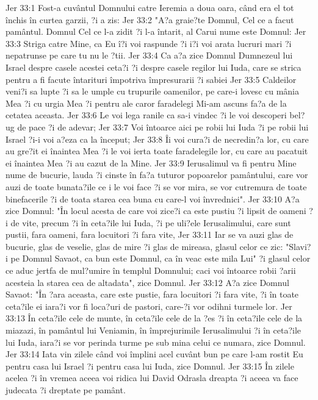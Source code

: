 Jer 33:1  Fost-a cuvântul Domnului catre Ieremia a doua oara, când era el tot închis în curtea garzii, ?i a zis:
Jer 33:2  "A?a graie?te Domnul, Cel ce a facut pamântul. Domnul Cel ce l-a zidit ?i l-a întarit, al Carui nume este Domnul:
Jer 33:3  Striga catre Mine, ca Eu î?i voi raspunde ?i i?i voi arata lucruri mari ?i nepatrunse pe care tu nu le ?tii.
Jer 33:4  Ca a?a zice Domnul Dumnezeul lui Israel despre casele acestei ceta?i ?i despre casele regilor lui Iuda, care se strica pentru a fi facute întarituri împotriva împresurarii ?i sabiei
Jer 33:5  Caldeilor veni?i sa lupte ?i sa le umple cu trupurile oamenilor, pe care-i lovesc cu mânia Mea ?i cu urgia Mea ?i pentru ale caror faradelegi Mi-am ascuns fa?a de la cetatea aceasta.
Jer 33:6  Le voi lega ranile ca sa-i vindec ?i le voi descoperi bel?ug de pace ?i de adevar;
Jer 33:7  Voi întoarce aici pe robii lui Iuda ?i pe robii lui Israel ?i-i voi a?eza ca la început;
Jer 33:8  Îi voi cura?i de necredin?a lor, cu care au gre?it ei înaintea Mea ?i le voi ierta toate faradelegile lor, cu care au pacatuit ei înaintea Mea ?i au cazut de la Mine.
Jer 33:9  Ierusalimul va fi pentru Mine nume de bucurie, lauda ?i cinste în fa?a tuturor popoarelor pamântului, care vor auzi de toate bunata?ile ce i le voi face ?i se vor mira, se vor cutremura de toate binefacerile ?i de toata starea cea buna cu care-l voi învrednici".
Jer 33:10  A?a zice Domnul: "În locul acesta de care voi zice?i ca este pustiu ?i lipsit de oameni ?i de vite, precum ?i în ceta?ile lui Iuda, ?i pe uli?ele Ierusalimului, care sunt pustii, fara oameni, fara locuitori ?i fara vite,
Jer 33:11  Iar se va auzi glas de bucurie, glas de veselie, glas de mire ?i glas de mireasa, glasul celor ce zic: "Slavi?i pe Domnul Savaot, ca bun este Domnul, ca în veac este mila Lui" ?i glasul celor ce aduc jertfa de mul?umire în templul Domnului; caci voi întoarce robii ?arii acesteia la starea cea de altadata", zice Domnul.
Jer 33:12  A?a zice Domnul Savaot: "În ?ara aceasta, care este pustie, fara locuitori ?i fara vite, ?i în toate ceta?ile ei iara?i vor fi loca?uri de pastori, care-?i vor odihni turmele lor.
Jer 33:13  În ceta?ile cele de munte, în ceta?ile cele de la ?es ?i în ceta?ile cele de la miazazi, în pamântul lui Veniamin, în împrejurimile Ierusalimului ?i în ceta?ile lui Iuda, iara?i se vor perinda turme pe sub mina celui ce numara, zice Domnul.
Jer 33:14  Iata vin zilele când voi împlini acel cuvânt bun pe care l-am rostit Eu pentru casa lui Israel ?i pentru casa lui Iuda, zice Domnul.
Jer 33:15  În zilele acelea ?i în vremea aceea voi ridica lui David Odrasla dreapta ?i aceea va face judecata ?i dreptate pe pamânt.
